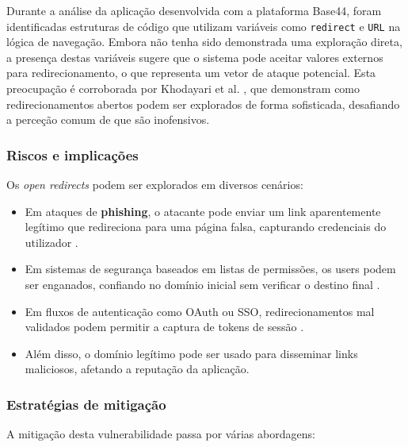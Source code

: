 Durante a análise da aplicação desenvolvida com a plataforma Base44, foram identificadas estruturas de código que utilizam variáveis como \texttt{redirect} e \texttt{URL} na lógica de navegação. Embora não tenha sido demonstrada uma exploração direta, a presença destas variáveis sugere que o sistema pode aceitar valores externos para redirecionamento, o que representa um vetor de ataque potencial. Esta preocupação é corroborada por Khodayari et al. \cite{ref43}, que demonstram como redirecionamentos abertos podem ser explorados de forma sofisticada, desafiando a perceção comum de que são inofensivos.

\subsubsection{Riscos e implicações}
\label{subsubsec:riscos-implicacoes-open-redirects}

Os \textit{open redirects} podem ser explorados em diversos cenários:

\begin{itemize}
    \item Em ataques de \textbf{phishing}, o atacante pode enviar um link aparentemente legítimo que redireciona para uma página falsa, capturando credenciais do utilizador \cite{ref44}.
    
    \item Em sistemas de segurança baseados em listas de permissões, os users podem ser enganados, confiando no domínio inicial sem verificar o destino final \cite{ref43}.
    
    \item Em fluxos de autenticação como OAuth ou SSO, redirecionamentos mal validados podem permitir a captura de tokens de sessão \cite{ref45}.
    
    \item Além disso, o domínio legítimo pode ser usado para disseminar links maliciosos, afetando a reputação da aplicação.
\end{itemize}

\subsubsection{Estratégias de mitigação}
\label{subsubsec:estrategias-mitigacao-open-redirects}

A mitigação desta vulnerabilidade passa por várias abordagens:

